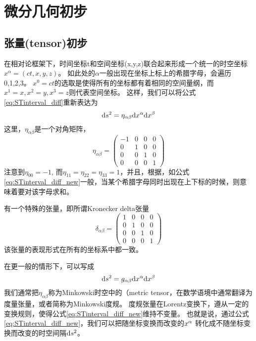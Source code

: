 \section{微分几何初步}
\subsection{张量(tensor)初步}\label{sec:tensor}
在相对论框架下，时间坐标t和空间坐标(x,y,z)联合起来形成一个统一的时空坐标
$x^{\alpha} = (ct,x,y,z)$。
如此处的$\alpha$一般出现在坐标上标上的希腊字母，会遍历{0,1,2,3}。
$x^0= ct$的选取是使得所有的坐标都有着相同的空间量纲，而$x^1 =x, x^2 = y, x^3 = z$则代表空间坐标。
这样，我们可以将公式\ref{eq:STinterval_diff}重新表达为
\begin{equation}\label{eq:STinterval_diff_new}
  {\rm d}s^2 = \eta_ {\alpha \beta}{\rm d}x^\alpha {\rm d} x^\beta
\end{equation}
这里，$\eta_ {\alpha \beta}$是一个对角矩阵，
\begin{equation}\label{eq:Minkowski}
  \eta_{\alpha\beta} ={\begin{pmatrix}
                       -1 & 0 & 0 & 0\\
                        0 & 1 & 0 & 0\\ 
                        0 & 0 & 1 & 0\\
                        0 & 0 & 0 & 1\end{pmatrix}}
\end{equation}
注意到$\eta_{00} = -1$, 而$\eta_{11} = \eta_{22} = \eta_{33} = 1$，并且，根据{}，如公式\ref{eq:STinterval_diff_new}一般，当某个希腊字母同时出现在上下标的时候，则意味着要对该字母求和。


\begin{myprop}{}{}
  有一个特殊的张量，即所谓Kronecker delta张量
\begin{equation}\label{eq:Kronecker}
  \delta_{\alpha\beta} ={\begin{pmatrix}
                        1 & 0 & 0 & 0\\
                        0 & 1 & 0 & 0\\ 
                        0 & 0 & 1 & 0\\
                        0 & 0 & 0 & 1\end{pmatrix}}
\end{equation}
  该张量的表现形式在所有的坐标系中都一致。
\end{myprop}

在更一般的情形下，可以写成
\begin{equation}\label{eq:metric}
  {\rm d}s^2 = g_{\alpha \beta}{\rm d}x^\alpha {\rm d} x^\beta
\end{equation}
我们通常把$\eta_ {\alpha \beta}$称为Minkowski时空中的{}（metric tensor，在数学语境中通常翻译为度量张量，或者简称为Minkowski度规。
度规张量在Lorentz变换下，遵从一定的变换规则，使得公式\ref{eq:STinterval_diff_new}维持不变量。
也就是说，通过公式\ref{eq:STinterval_diff_new}，我们可以把随坐标变换而改变的${\rm }x^{\alpha} $ 转化成不随坐标变换而改变的时空间隔${\rm d} s^2$。

